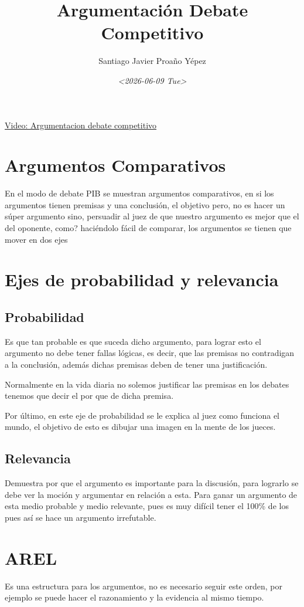 \documentclass[11pt]{article}
\author{Santiago Javier Proaño Yépez}
\date{\textit{<2026-06-09 Tue>}}
\title{Argumentación Debate Competitivo}
\begin{document}
\maketitle
\tableofcontents

\href{https://youtu.be/3gLqaw0phUA?si=TkTlNA8Pw1KpGrKV}{Video: Argumentacion debate competitivo}

\section{Argumentos Comparativos}
\label{sec:org9ae00cc}
En el modo de debate PIB se muestran argumentos comparativos, en si los
argumentos tienen premisas y una conclusión, el objetivo pero, no es
hacer un súper argumento sino, persuadir al juez de que nuestro
argumento es mejor que el del oponente, como? haciéndolo fácil de
comparar, los argumentos se tienen que mover en dos ejes
\section{Ejes de probabilidad y relevancia}
\label{sec:org386d210}
\subsection{Probabilidad}
\label{sec:orgd5da408}
Es que tan probable es que suceda dicho argumento, para lograr esto el
argumento no debe tener fallas lógicas, es decir, que las premisas no
contradigan a la conclusión, además dichas premisas deben de tener una
justificación.

Normalmente en la vida diaria no solemos justificar las premisas en
los debates tenemos que decir el por que de dicha premisa.

Por último, en este eje de probabilidad se le explica al juez como
funciona el mundo, el objetivo de esto es dibujar una imagen en la
mente de los jueces. 
\subsection{Relevancia}
\label{sec:org05c7e2f}
Demuestra por que el argumento es importante para la discusión, para
lograrlo se debe ver la moción y argumentar en relación a esta. Para
ganar un argumento de esta medio probable y medio relevante, pues es
muy difícil tener el 100\% de los pues así se hace un argumento
irrefutable.
\section{AREL}
\label{sec:org15a6e21}
Es una estructura para los argumentos, no es necesario seguir este
orden, por ejemplo se puede hacer el razonamiento y la evidencia al
mismo tiempo. 
\end{document}
